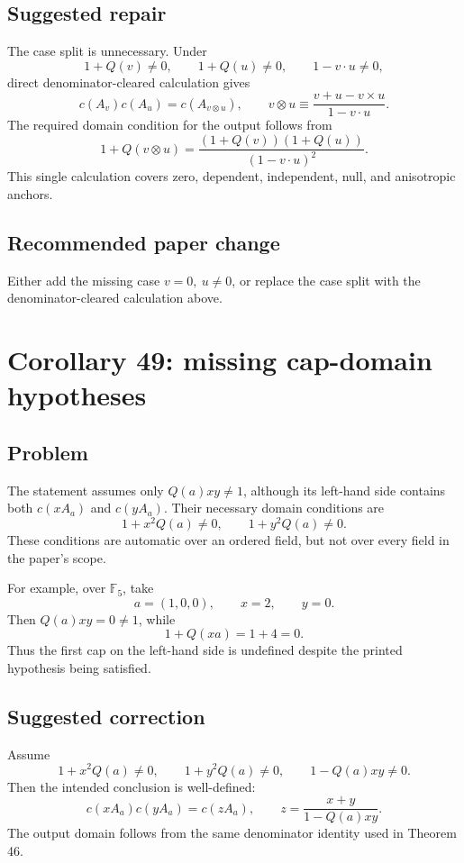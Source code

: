 \documentclass[11pt]{article}
\newcommand{\F}{\mathbb F}
\begin{document}
\subsection{Suggested repair}

The case split is unnecessary.  Under
\[
 1+Q(v)\ne0,\qquad 1+Q(u)\ne0,\qquad
 1-v\mathbin{\cdot}u\ne0,
\]
direct denominator-cleared calculation gives
\[
 c(A_v)c(A_u)=c(A_{v\otimes u}),\qquad
 v\otimes u\equiv\frac{v+u-v\times u}{1-v\mathbin{\cdot}u}.
\]
The required domain condition for the output follows from
\[
 1+Q(v\otimes u)=
 \frac{(1+Q(v))(1+Q(u))}
      {(1-v\mathbin{\cdot}u)^2}.
\]
This single calculation covers zero, dependent, independent, null, and
anisotropic anchors.

\subsection{Recommended paper change}

Either add the missing case \(v=0,\ u\ne0\), or replace the case split with
the denominator-cleared calculation above.

\section{Corollary 49: missing cap-domain hypotheses}

\subsection{Problem}

The statement assumes only \(Q(a)xy\ne1\), although its left-hand side
contains both \(c(xA_a)\) and \(c(yA_a)\).  Their necessary domain conditions
are
\[
 1+x^2Q(a)\ne0,\qquad 1+y^2Q(a)\ne0.
\]
These conditions are automatic over an ordered field, but not over every
field in the paper's scope.

For example, over \(\F_5\), take
\[
 a=(1,0,0),\qquad x=2,\qquad y=0.
\]
Then \(Q(a)xy=0\ne1\), while
\[
 1+Q(xa)=1+4=0.
\]
Thus the first cap on the left-hand side is undefined despite the printed
hypothesis being satisfied.

\subsection{Suggested correction}

Assume
\[
 1+x^2Q(a)\ne0,\qquad
 1+y^2Q(a)\ne0,\qquad
 1-Q(a)xy\ne0.
\]
Then the intended conclusion is well-defined:
\[
 c(xA_a)c(yA_a)=c(zA_a),\qquad
 z=\frac{x+y}{1-Q(a)xy}.
\]
The output domain follows from the same denominator identity used in
Theorem 46.
\end{document}
